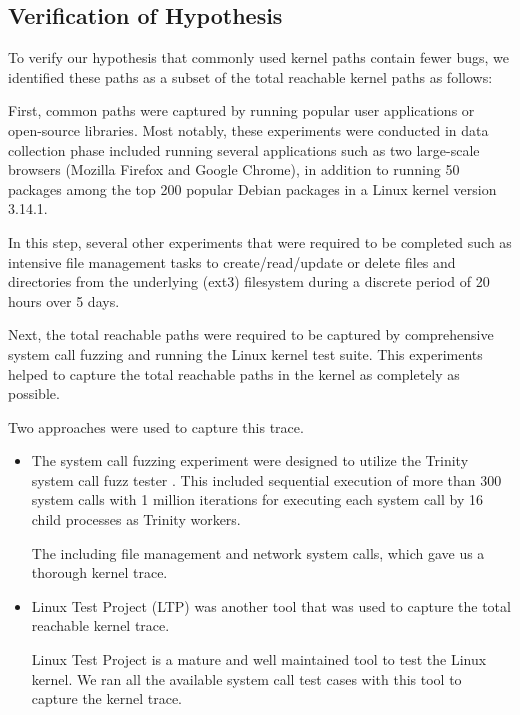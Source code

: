 \subsection{Verification of Hypothesis}
\label{Verification-of-Hypothesis}

To verify our hypothesis that commonly used kernel paths contain fewer bugs, 
we identified these paths as a subset of the total reachable kernel paths as follows:

First, common paths were captured by running popular user applications or open-source libraries. Most notably, these experiments were conducted in data collection phase included running several applications such as two large-scale browsers (Mozilla Firefox and Google Chrome), in addition to running 50 packages among the top 200 popular Debian packages \cite{Top-Packages} in a Linux kernel version 3.14.1.
  

In this step, several other experiments that were required to be completed such as intensive file management tasks to create/read/update or delete files and directories from the underlying (ext3) filesystem during a discrete period of 20 hours over 5 days.

Next, the total reachable paths were required to be captured by comprehensive system call fuzzing and running the Linux kernel test suite. This experiments helped to capture the total reachable paths in the kernel as completely  as possible. 

Two approaches were used to capture this trace.

\begin{itemize}
\item The system call fuzzing experiment were designed to utilize the Trinity system call fuzz tester \cite{Trinity}. This included sequential execution of more than 300 system calls with 1 million iterations for executing each system call by 16 child processes as Trinity workers.

The including file management and network system calls,  which gave us a thorough kernel trace. 

\item Linux Test Project (LTP) \cite{LTP} was another tool that was used to capture the total reachable kernel trace.

Linux Test Project is a mature and well maintained tool to test the Linux
kernel. 
We ran all the available system call test cases with this tool to capture
the kernel trace. 
\end{itemize}

